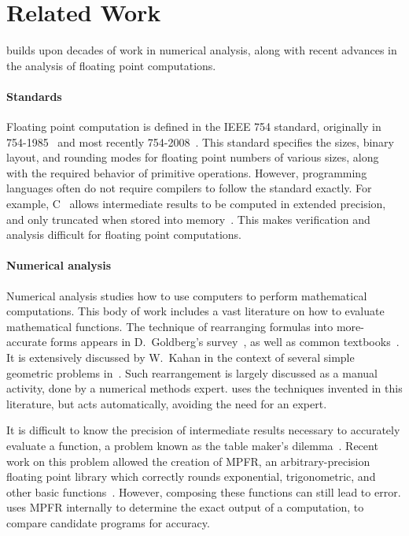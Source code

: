 \documentclass[paper.tex]{subfiles}
\begin{document}
\section{Related Work}
\label{sec:relatedwork}

\casio builds upon decades of work in numerical analysis,
  along with recent advances in the analysis
  of floating point computations.

\paragraph{Standards}
Floating point computation is defined in the IEEE 754 standard,
  originally in 754-1985~\cite{ieee85-standard}
  and most recently 754-2008~\cite{ieee08-standard}.
This standard specifies the sizes, binary layout, and rounding modes
  for floating point numbers of various sizes,
  along with the required behavior of primitive operations.
However, programming languages often
  do not require compilers to follow the standard exactly.
For example, C~\cite{c99} allows intermediate results
  to be computed in extended precision,
  and only truncated when stored into memory~\cite{toplas08-pitfalls-verifying}.
This makes verification and analysis difficult
  for floating point computations.

\paragraph{Numerical analysis}

Numerical analysis studies how to use computers
  to perform mathematical computations.
This body of work includes a vast literature
  on how to evaluate mathematical functions.
The technique of rearranging formulas into more-accurate forms
  appears in D.~Goldberg's survey~\cite{acm91-every-scientist},
  as well as common textbooks~\cite{book87-nmse}.
It is extensively discussed by W.~Kahan in the context
  of several simple geometric problems in~\cite{berkeley00-needle-like}.
Such rearrangement is largely discussed as a manual activity,
  done by a numerical methods expert.
\casio uses the techniques invented in this literature,
  but acts automatically, avoiding the need for an expert.

It is difficult to know the precision of intermediate results
  necessary to accurately evaluate a function,
  a problem known as the table maker's dilemma~\cite{ensl03-table-maker}.
Recent work on this problem allowed the creation of MPFR,
  an arbitrary-precision floating point library
  which correctly rounds exponential, trigonometric, and other basic functions~\cite{acm07-mpfr}.
However, composing these functions can still lead to error.
\casio uses MPFR internally to determine
  the exact output of a computation,
  to compare candidate programs for accuracy.
\end{document}
